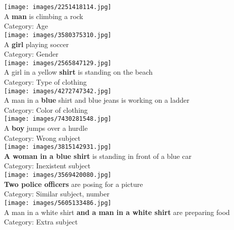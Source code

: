 \documentclass[11pt,a4paper]{article}
\begin{document}
\begin{multicols}{2}
\centering
\texttt{[image: images/2251418114.jpg]}\\
A \textbf{man} is climbing a rock\\
Category: Age\\[3ex]

\texttt{[image: images/3580375310.jpg]}\\
A \textbf{girl} playing soccer\\
Category: Gender\\[3ex]

\texttt{[image: images/2565847129.jpg]}\\
A girl in a yellow \textbf{shirt} is standing on the beach\\
Category: Type of clothing\\[3ex]

\texttt{[image: images/4272747342.jpg]}\\
A man in a \textbf{blue} shirt and blue jeans is working on a ladder\\ 
Category: Color of clothing\\[3ex]

\texttt{[image: images/7430281548.jpg]}\\
A \textbf{boy} jumps over a hurdle\\
Category: Wrong subject\\[3ex]

\texttt{[image: images/3815142931.jpg]}\\
\textbf{A woman in a blue shirt} is standing in front of a blue car\\
Category: Inexistent subject\\[3ex]

\texttt{[image: images/3569420080.jpg]}\\
\textbf{Two police officers} are posing for a picture\\
Category: Similar subject, number\\[3ex]

\texttt{[image: images/5605133486.jpg]}\\
A man in a white shirt \textbf{and a man in a white shirt} are preparing food\\ 
Category: Extra subject\\[3ex]


\end{multicols}
\end{document}
